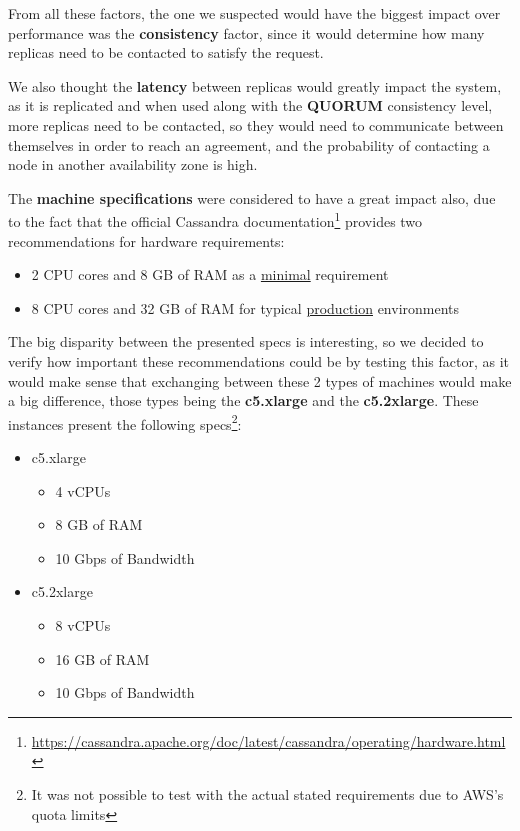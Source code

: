 \documentclass[runningheads]{llncs}
\begin{document}
From all these factors, the one we suspected would have the biggest impact over performance was the \textbf{consistency} factor, since it would determine how many replicas need to be contacted to satisfy the request.

We also thought the \textbf{latency} between replicas would greatly impact the system, as it is replicated and when used along with the \textbf{QUORUM} consistency level, more replicas need to be contacted, so they would need to communicate between themselves in order to reach an agreement, and the probability of contacting a node in another availability zone is high.

The \textbf{machine specifications} were considered to have a great impact also, due to the fact that the official Cassandra documentation\footnote{\url{https://cassandra.apache.org/doc/latest/cassandra/operating/hardware.html}} provides two recommendations for hardware requirements:

\begin{itemize}
    \item 2 CPU cores and 8 GB of RAM as a \underline{minimal} requirement
    \item 8 CPU cores and 32 GB of RAM for typical \underline{production} environments
\end{itemize}

The big disparity between the presented specs is interesting, so we decided to verify how important these recommendations could be by testing this factor, as it would make sense that exchanging between these 2 types of machines would make a big difference, those types being the \textbf{c5.xlarge} and the \textbf{c5.2xlarge}. These instances present the following specs\footnote{It was not possible to test with the actual stated requirements due to AWS's quota limits}:
\begin{itemize}
    \item c5.xlarge
    \begin{itemize}
        \item 4 vCPUs
        \item 8 GB of RAM
        \item 10 Gbps of Bandwidth
    \end{itemize}
    \item c5.2xlarge
    \begin{itemize}
        \item 8 vCPUs
        \item 16 GB of RAM
        \item 10 Gbps of Bandwidth
    \end{itemize}
\end{itemize}
\end{document}
